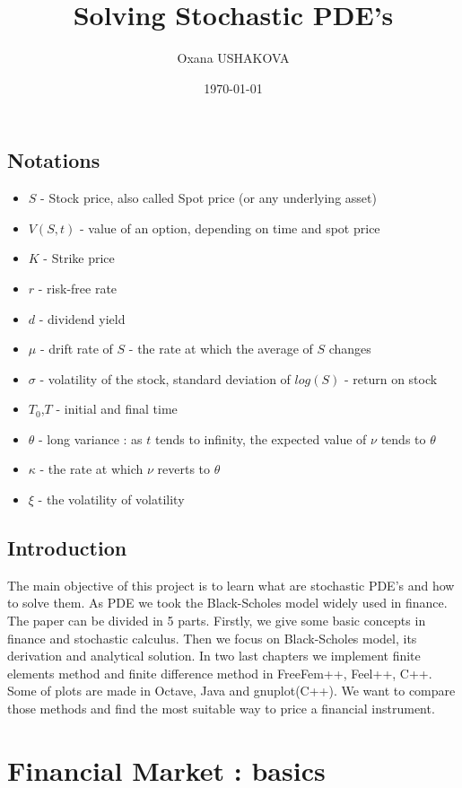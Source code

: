 \documentclass[a4paper]{report}
\title{ Solving Stochastic PDE's   }
\author{Oxana USHAKOVA}
\date {\today}
\begin{document}
\maketitle
\tableofcontents
\newpage
\section*{Notations}
\begin{itemize}
\item $S$ - Stock price, also called Spot price (or any underlying asset)
\item $V(S,t)$ - value of an option, depending on time and spot price
\item $K$ - Strike price
\item $r$ - risk-free rate
\item $d$ - dividend yield
\item $\mu$ - drift rate of $S$ - the rate at which the average of $S$ changes
\item $\sigma$ - volatility of the stock, standard deviation of $log(S)$ - return on stock
\item $T_0$,$T$ - initial and final time
\item $\theta$ - long variance : as $t$ tends to infinity, the expected value of $\nu$ tends to $\theta$ 
\item $\kappa$ - the rate at which $\nu$ reverts to $\theta$
\item $\xi$ - the volatility of volatility
\end{itemize}


\newpage
\section*{Introduction}


The main objective of this project is to learn what are stochastic PDE's and how to solve them. As PDE we took the Black-Scholes model widely used in finance. 
\newline
The paper can be divided in 5 parts. Firstly, we give some basic concepts in finance and stochastic calculus. Then we focus on Black-Scholes model, its derivation and analytical solution. In two last chapters we implement finite elements method and finite difference method in FreeFem++, Feel++, C++. Some of plots are made in Octave, Java and gnuplot(C++). We want to compare those methods and find the most suitable way to price a financial instrument.

  

\chapter{Financial Market : basics}
\end{document}

